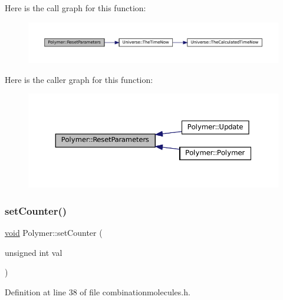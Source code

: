 Here is the call graph for this function\+:\nopagebreak
\begin{figure}[H]
\begin{center}
\leavevmode
\includegraphics[width=350pt]{class_polymer_aa20f1e5c79e8631afa291569d5030103_cgraph}
\end{center}
\end{figure}
Here is the caller graph for this function\+:\nopagebreak
\begin{figure}[H]
\begin{center}
\leavevmode
\includegraphics[width=350pt]{class_polymer_aa20f1e5c79e8631afa291569d5030103_icgraph}
\end{center}
\end{figure}
\mbox{\label{class_polymer_a7ed6bbe09a570b59f9253d63fd3326d2}} 
\subsubsection{\texorpdfstring{set\+Counter()}{setCounter()}\hspace{0.1cm}{\footnotesize\ttfamily [1/10]}}
{\footnotesize\ttfamily \mbox{\hyperlink{glad_8h_a950fc91edb4504f62f1c577bf4727c29}{void}} Polymer\+::set\+Counter (\begin{DoxyParamCaption}\item[{unsigned int}]{val }\end{DoxyParamCaption})\hspace{0.3cm}{\ttfamily [inline]}}



Definition at line 38 of file combinationmolecules.\+h.

\mbox{\label{class_polymer_a7ed6bbe09a570b59f9253d63fd3326d2}} 

